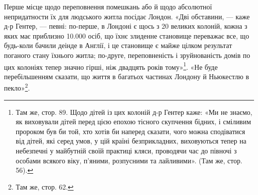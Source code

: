 Перше місце щодо переповнення помешкань або й щодо абсолютної
непридатности їх для людського житла посідає Лондон.
«Дві обставини, — каже д-р Гентер, — певні: по-перше, в Лондоні
є щось з 20 великих колоній, кожна з яких має приблизно
\num{10.000}  осіб, що їхнє злиденне становище переважає все, що будь-коли
бачили деінде в Англії, і це становище є майже цілком результат
поганого стану їхнього житла; по-друге, переповненість і зруйнованість
домів по цих колоніях тепер значно гірші, ніж двадцять
років тому»\footnote{
Там же, стор. 89. Щодо дітей із цих колоній д-р Гентер каже:
«Ми не знаємо, як виховували дітей перед цією епохою тісного скупчення
бідних, і сміливим пророком був би той, хто хотів би наперед сказати,
чого можна сподіватися від дітей, які серед умов, у цій країні безприкладних,
виховуються тепер на небезпечні у майбутній своїй практиці кляси,
проводячи час до півночі з особами всякого віку, п'яними, розпусними та
лайливими». (Там же, стор. 56).
}. «Не буде перебільшенням сказати, що
життя в багатьох частинах Лондону й Ньюкестлю в пекло»\footnote{
Там же, стор. 62.
}.

